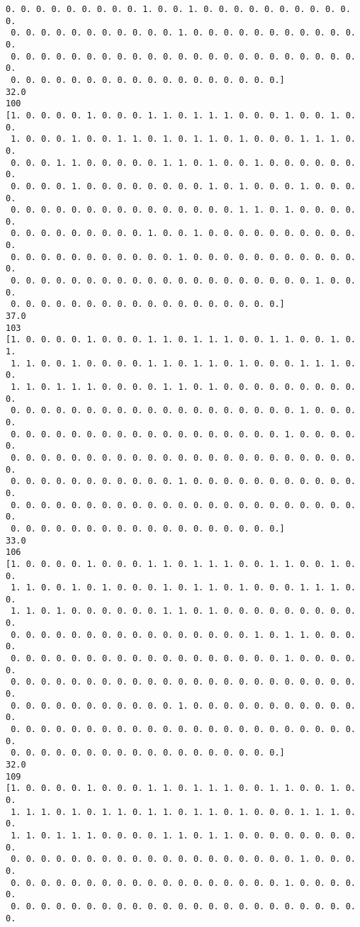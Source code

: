 \documentclass[11pt]{article}
\begin{document}
\begin{Verbatim}[commandchars=\\\{\}]
 0. 0. 0. 0. 0. 0. 0. 0. 0. 1. 0. 0. 1. 0. 0. 0. 0. 0. 0. 0. 0. 0. 0. 0.
 0. 0. 0. 0. 0. 0. 0. 0. 0. 0. 0. 1. 0. 0. 0. 0. 0. 0. 0. 0. 0. 0. 0. 0.
 0. 0. 0. 0. 0. 0. 0. 0. 0. 0. 0. 0. 0. 0. 0. 0. 0. 0. 0. 0. 0. 0. 0. 0.
 0. 0. 0. 0. 0. 0. 0. 0. 0. 0. 0. 0. 0. 0. 0. 0. 0. 0.]
32.0
100
[1. 0. 0. 0. 0. 1. 0. 0. 0. 1. 1. 0. 1. 1. 1. 0. 0. 0. 1. 0. 0. 1. 0. 0.
 1. 0. 0. 0. 1. 0. 0. 1. 1. 0. 1. 0. 1. 1. 0. 1. 0. 0. 0. 1. 1. 1. 0. 0.
 0. 0. 0. 1. 1. 0. 0. 0. 0. 0. 1. 1. 0. 1. 0. 0. 1. 0. 0. 0. 0. 0. 0. 0.
 0. 0. 0. 0. 1. 0. 0. 0. 0. 0. 0. 0. 0. 1. 0. 1. 0. 0. 0. 1. 0. 0. 0. 0.
 0. 0. 0. 0. 0. 0. 0. 0. 0. 0. 0. 0. 0. 0. 0. 1. 1. 0. 1. 0. 0. 0. 0. 0.
 0. 0. 0. 0. 0. 0. 0. 0. 0. 1. 0. 0. 1. 0. 0. 0. 0. 0. 0. 0. 0. 0. 0. 0.
 0. 0. 0. 0. 0. 0. 0. 0. 0. 0. 0. 1. 0. 0. 0. 0. 0. 0. 0. 0. 0. 0. 0. 0.
 0. 0. 0. 0. 0. 0. 0. 0. 0. 0. 0. 0. 0. 0. 0. 0. 0. 0. 0. 0. 1. 0. 0. 0.
 0. 0. 0. 0. 0. 0. 0. 0. 0. 0. 0. 0. 0. 0. 0. 0. 0. 0.]
37.0
103
[1. 0. 0. 0. 0. 1. 0. 0. 0. 1. 1. 0. 1. 1. 1. 0. 0. 1. 1. 0. 0. 1. 0. 1.
 1. 1. 0. 0. 1. 0. 0. 0. 0. 1. 1. 0. 1. 1. 0. 1. 0. 0. 0. 1. 1. 1. 0. 0.
 1. 1. 0. 1. 1. 1. 0. 0. 0. 0. 1. 1. 0. 1. 0. 0. 0. 0. 0. 0. 0. 0. 0. 0.
 0. 0. 0. 0. 0. 0. 0. 0. 0. 0. 0. 0. 0. 0. 0. 0. 0. 0. 0. 1. 0. 0. 0. 0.
 0. 0. 0. 0. 0. 0. 0. 0. 0. 0. 0. 0. 0. 0. 0. 0. 0. 0. 1. 0. 0. 0. 0. 0.
 0. 0. 0. 0. 0. 0. 0. 0. 0. 0. 0. 0. 0. 0. 0. 0. 0. 0. 0. 0. 0. 0. 0. 0.
 0. 0. 0. 0. 0. 0. 0. 0. 0. 0. 0. 1. 0. 0. 0. 0. 0. 0. 0. 0. 0. 0. 0. 0.
 0. 0. 0. 0. 0. 0. 0. 0. 0. 0. 0. 0. 0. 0. 0. 0. 0. 0. 0. 0. 0. 0. 0. 0.
 0. 0. 0. 0. 0. 0. 0. 0. 0. 0. 0. 0. 0. 0. 0. 0. 0. 0.]
33.0
106
[1. 0. 0. 0. 0. 1. 0. 0. 0. 1. 1. 0. 1. 1. 1. 0. 0. 1. 1. 0. 0. 1. 0. 0.
 1. 1. 0. 0. 1. 0. 1. 0. 0. 0. 1. 0. 1. 1. 0. 1. 0. 0. 0. 1. 1. 1. 0. 0.
 1. 1. 0. 1. 0. 0. 0. 0. 0. 0. 1. 1. 0. 1. 0. 0. 0. 0. 0. 0. 0. 0. 0. 0.
 0. 0. 0. 0. 0. 0. 0. 0. 0. 0. 0. 0. 0. 0. 0. 0. 1. 0. 1. 1. 0. 0. 0. 0.
 0. 0. 0. 0. 0. 0. 0. 0. 0. 0. 0. 0. 0. 0. 0. 0. 0. 0. 1. 0. 0. 0. 0. 0.
 0. 0. 0. 0. 0. 0. 0. 0. 0. 0. 0. 0. 0. 0. 0. 0. 0. 0. 0. 0. 0. 0. 0. 0.
 0. 0. 0. 0. 0. 0. 0. 0. 0. 0. 0. 1. 0. 0. 0. 0. 0. 0. 0. 0. 0. 0. 0. 0.
 0. 0. 0. 0. 0. 0. 0. 0. 0. 0. 0. 0. 0. 0. 0. 0. 0. 0. 0. 0. 0. 0. 0. 0.
 0. 0. 0. 0. 0. 0. 0. 0. 0. 0. 0. 0. 0. 0. 0. 0. 0. 0.]
32.0
109
[1. 0. 0. 0. 0. 1. 0. 0. 0. 1. 1. 0. 1. 1. 1. 0. 0. 1. 1. 0. 0. 1. 0. 0.
 1. 1. 1. 0. 1. 0. 1. 1. 0. 1. 1. 0. 1. 1. 0. 1. 0. 0. 0. 1. 1. 1. 0. 0.
 1. 1. 0. 1. 1. 1. 0. 0. 0. 0. 1. 1. 0. 1. 1. 0. 0. 0. 0. 0. 0. 0. 0. 0.
 0. 0. 0. 0. 0. 0. 0. 0. 0. 0. 0. 0. 0. 0. 0. 0. 0. 0. 0. 1. 0. 0. 0. 0.
 0. 0. 0. 0. 0. 0. 0. 0. 0. 0. 0. 0. 0. 0. 0. 0. 0. 0. 1. 0. 0. 0. 0. 0.
 0. 0. 0. 0. 0. 0. 0. 0. 0. 0. 0. 0. 0. 0. 0. 0. 0. 0. 0. 0. 0. 0. 0. 0.

\end{Verbatim}
\end{document}
